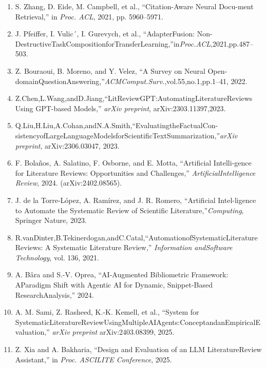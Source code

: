 \documentclass[
]{article}
\begin{document}
\begin{enumerate}
\item
  S. Zhang, D. Eide, M. Campbell, et al., ``Citation-Aware Neural Docu-\protect{}\label{_bookmark30}{}ment Retrieval,'' in \emph{Proc. ACL}, 2021, pp. 5960--5971.
\item
  J. Pfeiffer, I. Vulic´, I. Gurevych, et al., ``AdapterFusion: Non-DestructiveTaskCompositionforTransferLearning,''in\emph{Proc.ACL},2021,pp.487--503.
\item
  Z. Bouraoui, B. Moreno, and Y. Velez, ``A Survey on Neural Open-domainQuestionAnswering,''\emph{ACMComput.Surv.},vol.55,no.1,pp.1--\protect{}\label{_bookmark31}{}41, 2022.
\item
  Z.Chen,L.Wang,andD.Jiang,``LitReviewGPT:AutomatingLiteratureReviews Using GPT-based Models,'' \emph{arXiv preprint}, arXiv:2303.11397,\protect{}\label{_bookmark32}{}2023.
\item
  Q.Liu,H.Liu,A.Cohan,andN.A.Smith,``EvaluatingtheFactualCon-sistencyofLargeLanguageModelsforScientificTextSummarization,''\protect{}\label{_bookmark33}{}\emph{arXiv preprint}, arXiv:2306.03047, 2023.
\item
  F. Bolaños, A. Salatino, F. Osborne, and E. Motta, ``Artificial Intelli-gence for Literature Reviews: Opportunities and Challenges,'' \emph{Artificial}\protect{}\label{_bookmark34}{}\emph{Intelligence Review}, 2024. (arXiv:2402.08565).
\item
  J. de la Torre-López, A. Ramírez, and J. R. Romero, ``Artificial Intel-ligence to Automate the Systematic Review of Scientific Literature,''\protect{}\label{_bookmark35}{}\emph{Computing}, Springer Nature, 2023.
\item
  R.vanDinter,B.Tekinerdogan,andC.Catal,``AutomationofSystematicLiterature Reviews: A Systematic Literature Review,'' \emph{Information and}\protect{}\label{_bookmark36}{}\emph{Software Technology}, vol. 136, 2021.
\item
  A. Bâra and S.-V. Oprea, ``AI-Augmented Bibliometric Framework: AParadigm Shift with Agentic AI for Dynamic, Snippet-Based Research\protect{}\label{_bookmark37}{}Analysis,'' 2024.
\item
  A. M. Sami, Z. Rasheed, K.-K. Kemell, et al., ``System for SystematicLiteratureReviewUsingMultipleAIAgents:ConceptandanEmpirical\protect{}\label{_bookmark38}{}Evaluation,'' \emph{arXiv preprint} arXiv:2403.08399, 2025.
\item
  Z. Xia and A. Bakharia, ``Design and Evaluation of an LLM Literature\protect{}\label{_bookmark39}{}Review Assistant,'' in \emph{Proc. ASCILITE Conference}, 2025.

\end{enumerate}
\end{document}
